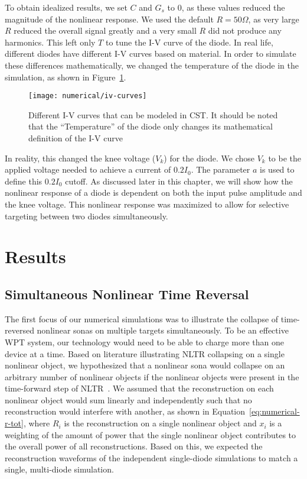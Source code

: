 To obtain idealized results, we set $C$ and $G_s$ to $0$, as these values reduced the magnitude of the nonlinear response. We used the default $R = 50 \Omega$, as very large $R$ reduced the overall signal greatly and a very small $R$ did not produce any harmonics. This left only $T$ to tune the I-V curve of the diode. In real life, different diodes have different I-V curves based on material. In order to simulate these differences mathematically, we changed the temperature of the diode in the simulation, as shown in Figure~\ref{fig:numerical-iv-curves}.

\begin{figure}[t]
\centering
\texttt{[image: numerical/iv-curves]}
\caption[I-V curves of diodes with different voltage knees]{Different I-V curves that can be modeled in CST. It should be noted that the ``Temperature'' of the diode only changes its mathematical definition of the I-V curve}
\label{fig:numerical-iv-curves}
\end{figure}

In reality, this changed the knee voltage ($V_{k}$) for the diode. We chose $V_{k}$ to be the applied voltage needed to achieve a current of $0.2 I_{0}$. The parameter $a$ is used to define this $0.2 I_{0}$ cutoff. As discussed later in this chapter, we will show how the nonlinear response of a diode is dependent on both the input pulse amplitude and the knee voltage. This nonlinear response was maximized to allow for selective targeting between two diodes simultaneously.
\section{Results}
\label{sec:numerical-results}

\subsection{Simultaneous Nonlinear Time Reversal}

The first focus of our numerical simulations was to illustrate the collapse of time-reversed nonlinear sonas on multiple targets simultaneously. To be an effective WPT system, our technology would need to be able to charge more than one device at a time. Based on literature illustrating NLTR collapsing on a single nonlinear object, we hypothesized that a nonlinear sona would collapse on an arbitrary number of nonlinear objects if the nonlinear objects were present in the time-forward step of NLTR~\cite{nltr-classical-waves,nltr-wave-chaotic}. We assumed that the reconstruction on each nonlinear object would sum linearly and independently such that no reconstruction would interfere with another, as shown in Equation~\ref{eq:numerical-r-tot}, where $R_{i}$ is the reconstruction on a single nonlinear object and $x_{i}$ is a weighting of the amount of power that the single nonlinear object contributes to the overall power of all reconstructions. Based on this, we expected the reconstruction waveforms of the independent single-diode simulations to match a single, multi-diode simulation.

